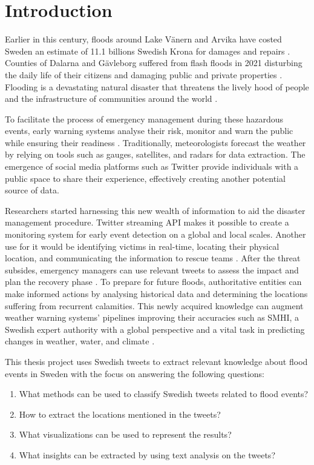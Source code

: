 \chapter{Introduction}

Earlier in this century, floods around Lake Vänern and Arvika have costed Sweden an estimate of 11.1
billions Swedish Krona for damages and repairs \cite{RiverFloodsSweden2022}. Counties of Dalarna and
Gävleborg suffered from flash floods in 2021 disturbing the daily life of their citizens and
damaging public and private properties \cite{daviesSwedenFlashFloods2021}.  Flooding is a
devastating natural disaster that threatens the lively hood of people and the infrastructure of
communities around the world \cite{Floodlist2021}.

To facilitate the process of emergency management during these hazardous events, early warning
systems analyse their risk, monitor and warn the public while ensuring their readiness
\cite{contributorsEarlyWarningSystem2022}. Traditionally, meteorologists forecast the weather by
relying on tools such as gauges, satellites, and radars for data extraction. The emergence of social
media platforms such as Twitter provide individuals with a public space to share their experience,
effectively creating another potential source of data.

Researchers started harnessing this new wealth of information to aid the disaster management
procedure.  Twitter streaming \ac{API} makes it possible to create a monitoring system for early event
detection on a global \cite{debruijnGlobalDatabaseHistoric2019b} and local
\cite{barkerDevelopmentNationalscaleRealtime2019} scales. Another use for it would be identifying
victims in real-time, locating their physical location, and communicating the information to rescue
teams \cite{singhEventClassificationLocation2019}. After the threat subsides, emergency
managers can use relevant tweets to assess the impact and plan the recovery phase
\cite{barkerDevelopmentNationalscaleRealtime2019}. To prepare for future floods, authoritative
entities can make informed actions by analysing historical data and determining the locations
suffering from recurrent calamities. This newly acquired knowledge can augment weather warning
systems' pipelines improving their accuracies such as \ac{SMHI}, a Swedish expert authority with a
global perspective and a vital task in predicting changes in weather, water, and climate \cite{SMHI2021}.

This thesis project uses Swedish tweets to extract relevant knowledge about flood events in Sweden
with the focus on answering the following questions:
\begin{enumerate}
  \item What methods can be used to classify Swedish tweets related to flood events?
  \item How to extract the locations mentioned in the tweets?
  \item What visualizations can be used to represent the results?
  \item What insights can be extracted by using text analysis on the tweets?
\end{enumerate}

